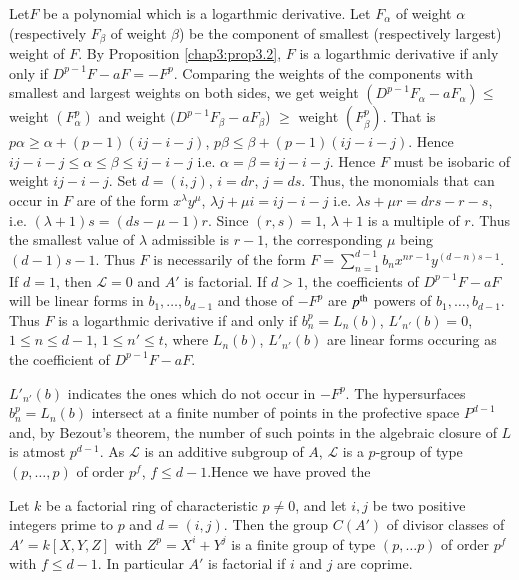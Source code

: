     \noindent
    Let\pageoriginale $F$ be a polynomial which is a logarthmic
    derivative. Let 
    $F_\alpha$ of weight $\alpha$ (respectively $F_\beta$ of weight
    $\beta$) be the component of smallest (respectively largest)
    weight of $F$. By Proposition \ref{chap3:prop3.2}, $F$ is a logarthmic
    derivative if anly only if $D^{p - 1} F - a F = - F^p$. Comparing
    the weights of the components with smallest and largest weights on
    both sides, we get weight $(D^{p -1} F_\alpha - a F_\alpha ) \le$
    weight $(F^p_\alpha)$ and weight $(D^{p-1} F_\beta - a F_\beta$)
    $\ge $ weight $(F^p_\beta)$. That is $p \alpha \ge \alpha + (p -
    1) (ij - i - j)$, $p \beta \le \beta + (p - 1) (ij - i - j)$. Hence
    $ij - i - j \le \alpha \le \beta \le ij - i - j $ i.e. $\alpha =
    \beta = ij - i - j$. Hence $F$ must be isobaric of weight $ij - i
    - j$. Set $d = (i, j)$, $i = dr$, $j = ds$. Thus, the monomials that
    can occur in $F$ are of the form $x^\lambda y^\mu$, $\lambda  j +
    \mu i = ij - i - j $ i.e. $\lambda s + \mu r = drs - r -s $,
    i.e. $(\lambda + 1) s = (ds - \mu - 1) r$. Since $(r, s) = 1$,
    $\lambda + 1$ is a multiple of $r$. Thus the smallest value of
    $\lambda$ admissible is $r - 1$, the corresponding $\mu $ being
    $(d-1)s-1$. Thus $F$ is necessarily of the form $F =
    \sum\limits_{n = 1}^{d- 1} b_n x^{nr - 1} y ^{(d-n)s-1}$. If $d =
    1$, then $\mathscr{L} = 0$ and $A'$ is factorial. If $d > 1$, the
    coefficients of $D^{p-1} F - a F $ will be linear forms in $b_1,
    \ldots , b_{d-1}$ and those of $-F^p$ are $p^{\rm th}$ powers of $b_1,
    \ldots , b_{d-1}$. Thus $F$ is a logarthmic derivative if and only
    if $b^p_n = L_n (b)$, $L'_{n'} (b) = 0$, $1\le n \le d- 1$, $1 \le n'
    \le t$, where $L_n(b)$, $L'_{n'} (b)$ are linear forms occuring as
    the coefficient of $D^{p-1} F - a F$. 
    
    $L'_{n'} (b)$ indicates the ones which do not occur in $ -
    F^p$. The hypersurfaces $b^p_n = L_n (b)$ intersect at a finite
    number of points in the profective space $P^{d-1}$ and, by
    Bezout's theorem, the number of such points in the algebraic
    closure of $L$ is atmost $p^{d-1} $. As $\mathscr{L}$ is an
    additive subgroup of $A$, $\mathscr{L}$ is a $p$-group of type $(p,
    \ldots, p)$ of order $p^f$, $f \le d - 1$.\pageoriginale Hence we
    have proved the  
    
    \setcounter{theorem}{0}
    \begin{theorem}\label{chap3:thm4.1} %
 Let $k$ be a factorial ring of characteristic $p \neq 0$, and let
  $i , j$ be two positive integers prime to $p$ and $d = (i, j)$. Then
  the group $C(A')$ of divisor classes of $A' = k [X, Y,Z]$ with $Z^p
  = X^i + Y^j $ is a finite group of type $(p, \ldots p)$ of order
  $p^f$ with $f \le d- 1$. In particular $A'$ is factorial if $i$ and
  $j$ are coprime. 
    \end{theorem} 
    
